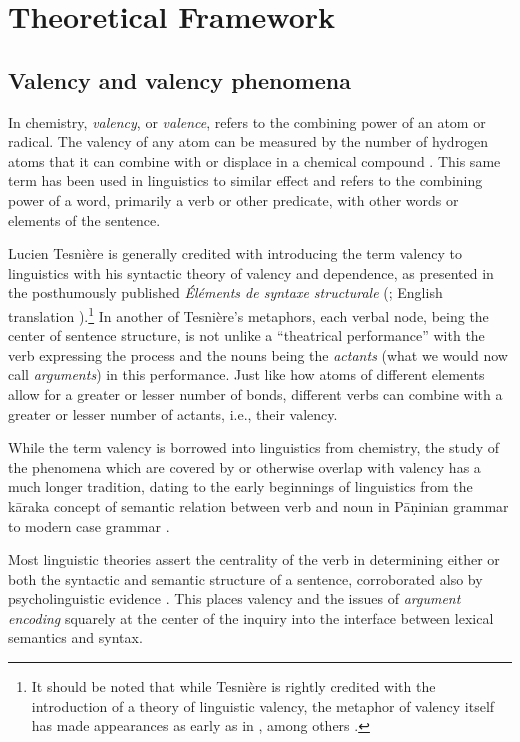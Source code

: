\section{Theoretical Framework}

\subsection{Valency and valency phenomena}


In chemistry, \textit{valency}, or \textit{valence}, refers to the combining power of an atom or radical. The valency of any atom can be measured by the number of hydrogen atoms that it can combine with or displace in a chemical compound \citep{law2020a}. This same term has been used in linguistics to similar effect and refers to the combining power of a word, primarily a verb or other predicate, with other words or elements of the sentence. 

Lucien Tesnière is generally credited with introducing the term valency to linguistics with his syntactic theory of valency and dependence, as presented in the posthumously published \textit{Éléments de syntaxe structurale} (\cite*{tesniere1959}; English translation \cite*{tesniere2015}).\footnote{
    It should be noted that while Tesnière is rightly credited with the introduction of a theory of linguistic valency, the metaphor of valency itself has made appearances as early as in \citet{peirce1897}, among others \citep{przepiorkowski2018}.
}
In another of Tesnière's metaphors, each verbal node, being the center of sentence structure, is not unlike a ``theatrical performance'' with the verb expressing the process and the nouns being the \textit{actants} (what we would now call \textit{arguments}) in this performance. Just like how atoms of different elements allow for a greater or lesser number of bonds, different verbs can combine with a greater or lesser number of actants, i.e., their valency.

While the term valency is borrowed into linguistics from chemistry, the study of the phenomena which are covered by or otherwise overlap with valency has a much longer tradition, dating to the early beginnings of linguistics from the kāraka concept of semantic relation between verb and noun \citep{ganeri2011a} in Pāṇinian grammar to modern case grammar \citep{fillmore1968}. 

Most linguistic theories assert the centrality of the verb in determining either or both the syntactic and semantic structure of a sentence, corroborated also by psycholinguistic evidence \citep{healy1970}. This places valency and the issues of \textit{argument encoding} squarely at the center of the inquiry into the interface between lexical semantics and syntax.

